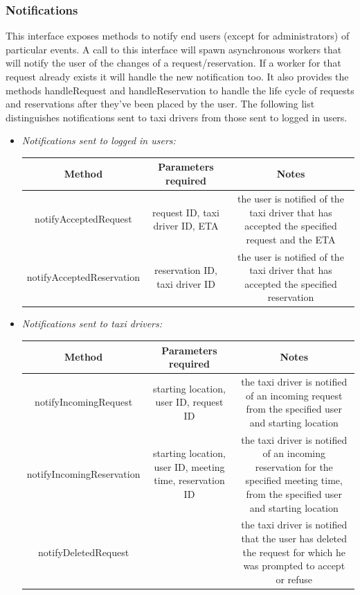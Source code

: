 \documentclass{article}
\begin{document}
\begin{itemize}
		\subsubsection{Notifications} 
		This interface exposes methods to notify end users (except for administrators) of particular events. 
		A call to this interface will spawn asynchronous workers that will notify the user of the changes of a request/reservation.
		If a worker for that request already exists it will handle the new notification too. It also provides the methods handleRequest and handleReservation to handle the life cycle of requests and reservations after they've been placed by the user.
		The following list distinguishes notifications sent to taxi drivers from those sent to logged in users.
		\begin{itemize}
			\item \textit{Notifications sent to logged in users:} \\
			\begin{adjustbox}{width=1.2\textwidth}	
				\begin{tabular}{*{3}{c}}
					\toprule
					Method & Parameters required & Notes \\
					\midrule
					notifyAcceptedRequest & request ID, taxi driver ID, ETA & the user is notified of the taxi driver that has accepted the specified request and the ETA\\ 
					notifyAcceptedReservation & reservation ID, taxi driver ID & the user is notified of the taxi driver that has accepted the specified reservation \\
					\bottomrule
				\end{tabular}
			\end{adjustbox}	
			\item \textit{Notifications sent to taxi drivers:} \\
			\begin{adjustbox}{width=1.2\textwidth}	
				\begin{tabular}{*{3}{c}}
					\toprule
					Method & Parameters required & Notes \\
					\midrule
					notifyIncomingRequest & starting location, user ID, request ID & the taxi driver is notified of an incoming request from the specified user and starting location\\ 
					notifyIncomingReservation & starting location, user ID, meeting time, reservation ID & the taxi driver is notified of an incoming reservation for the specified meeting time, from the specified user and starting location \\
					notifyDeletedRequest & & the taxi driver is notified that the user has deleted the request for which he was prompted to accept or refuse\\
					\bottomrule
				\end{tabular}
			\end{adjustbox}	
		\end{itemize}		
	\end{itemize}
\end{document}

